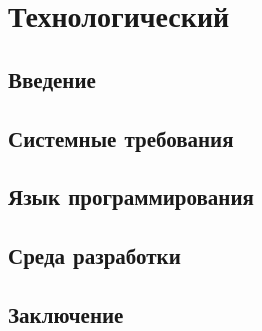 \section{Технологический}
\subsection{Введение}
\subsection{Системные требования}
\subsection{Язык программирования}
\subsection{Среда разработки}
\subsection{Заключение}